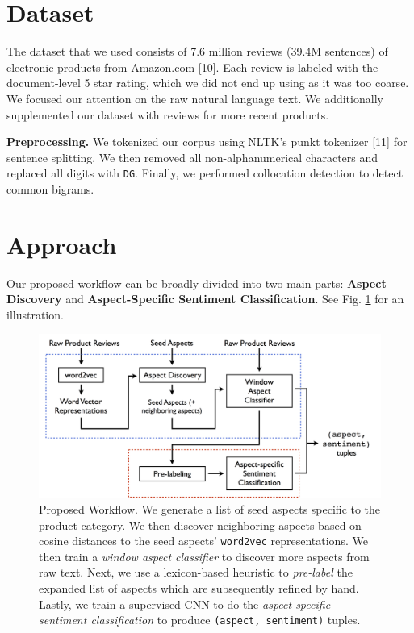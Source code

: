 \documentclass{article} %
\begin{document}

\section{Dataset}
The dataset that we used consists of 7.6 million reviews (39.4M sentences) of electronic products from Amazon.com [10]. Each review is labeled with the document-level 5 star rating, which we did not end up using as it was too coarse. We focused our attention on the raw natural language text. We additionally supplemented our dataset with reviews for more recent products.

\textbf{Preprocessing.} We tokenized our corpus using NLTK's punkt tokenizer [11] for sentence splitting. We then removed all non-alphanumerical characters and replaced all digits with \texttt{DG}. Finally, we performed collocation detection to detect common bigrams.

\section{Approach}

Our proposed workflow can be broadly divided into two main parts: {\bf Aspect Discovery} and {\bf Aspect-Specific Sentiment Classification}. See Fig. \ref{workflow} for an illustration.

\begin{figure}[ht]
\begin{center}
\includegraphics[width=.85\columnwidth]{workflow.png}
\end{center}
\caption{Proposed Workflow. We generate a list of seed aspects specific to the product category. We then discover neighboring aspects based on cosine distances to the seed aspects' \texttt{word2vec} representations. We then train a \textit{window aspect classifier} to discover more aspects from raw text. Next, we use a lexicon-based heuristic to \textit{pre-label} the expanded list of aspects which are subsequently refined by hand. Lastly, we train a supervised CNN to do the \textit{aspect-specific sentiment classification} to produce \texttt{(aspect, sentiment)} tuples.}
\label{workflow}
\end{figure}
\end{document}
